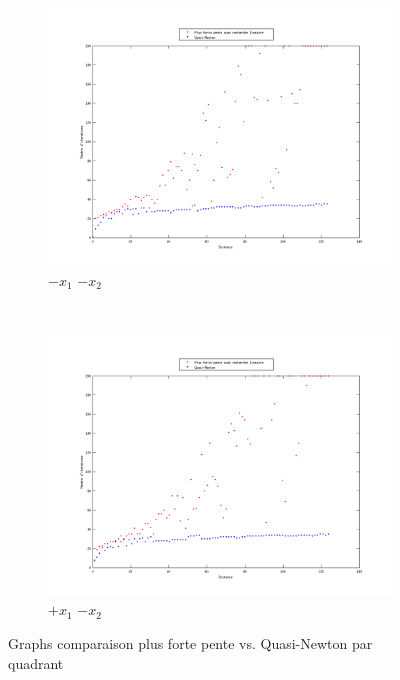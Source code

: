 \documentclass[11pt,a4paper,twoside,onecolumn,titlepage]{report}
\begin{document}
\begin{enumerate}[(a)]
\begin{figure}[h!]
	\begin{subfigure}[t]{0.5\textwidth}
		\centering
		\includegraphics[scale=0.4]{methods-quarter-1}
		\caption{$-x_1$ $-x_2$}
		\label{fig:awesome_image}
	\end{subfigure}%
        ~ %
    \begin{subfigure}[t]{0.5\textwidth}
		\centering
		\includegraphics[scale=0.4]{methods-quarter-2}
		\caption{$+x_1$ $-x_2$}
		\label{fig:awesome_image}
	\end{subfigure}
    \caption{Graphs comparaison plus forte pente vs. Quasi-Newton par quadrant}\label{fig:methods-4}
\end{figure}



\end{enumerate}
\end{document}
